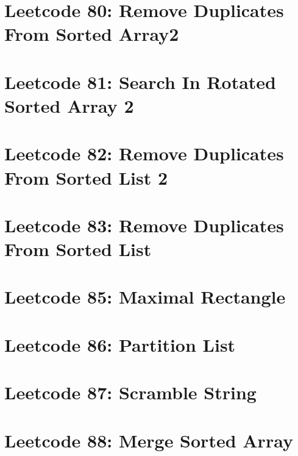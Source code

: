 \documentclass{article}
\begin{document}
\section*{Leetcode 80: Remove Duplicates From Sorted Array2}

\pagebreak 

\section*{Leetcode 81: Search In Rotated Sorted Array 2}

\pagebreak 

\section*{Leetcode 82: Remove Duplicates From Sorted List 2}

\pagebreak 

\section*{Leetcode 83: Remove Duplicates From Sorted List}

\pagebreak 

\section*{Leetcode 85: Maximal Rectangle}

\pagebreak 

\section*{Leetcode 86: Partition List}

\pagebreak 

\section*{Leetcode 87: Scramble String}

\pagebreak 

\section*{Leetcode 88: Merge Sorted Array}

\pagebreak 
\end{document}

